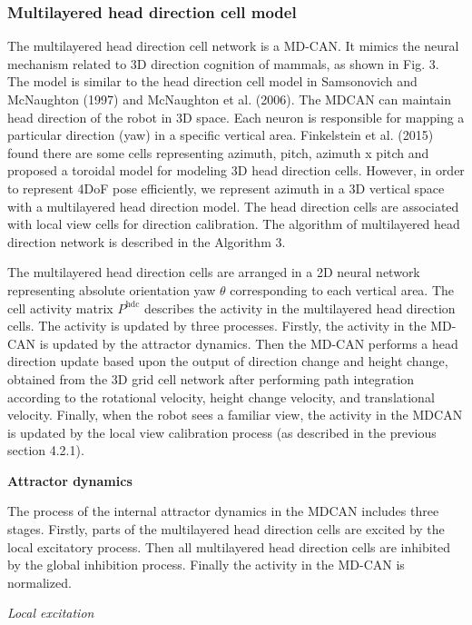 \subsubsection{Multilayered head direction cell model}

The multilayered head direction cell network is a MD-CAN. 
It mimics the neural mechanism related to 3D direction cognition of mammals, as shown in Fig. 3. 
The model is similar to the head direction cell model in Samsonovich and McNaughton (1997) and McNaughton et al. (2006). 
The MDCAN can maintain head direction of the robot in 3D space. 
Each neuron is responsible for mapping a particular direction (yaw) in a specific vertical area. 
Finkelstein et al. (2015) found there are some cells representing azimuth, pitch, azimuth x pitch and proposed a toroidal model for modeling 3D head direction cells. 
However, in order to represent 4DoF pose efficiently, we represent azimuth in a 3D vertical space with a multilayered head direction model. 
The head direction cells are associated with local view cells for direction calibration. 
The algorithm of multilayered head direction network is described in the Algorithm 3.


The multilayered head direction cells are arranged in a 2D neural network representing absolute orientation yaw $\theta$ corresponding to each vertical area. 
The cell activity matrix $P^{\text{hdc}}$ describes the activity in the multilayered head direction cells. 
The activity is updated by three processes. 
Firstly, the activity in the MD-CAN is updated by the attractor dynamics. 
Then the MD-CAN performs a head direction update based upon the output of direction change and height change, obtained from the 3D grid cell network after performing path integration according to the rotational velocity, height change velocity, and translational velocity. 
Finally, when the robot sees a familiar view, the activity in the MDCAN is updated by the local view calibration process (as described in the previous section 4.2.1).


\textbf{Attractor dynamics}

The process of the internal attractor dynamics in the MDCAN includes three stages. 
Firstly, parts of the multilayered head direction cells are excited by the local excitatory process. 
Then all multilayered head direction cells are inhibited by the global inhibition process. 
Finally the activity in the MD-CAN is normalized.


\textit{Local excitation}

